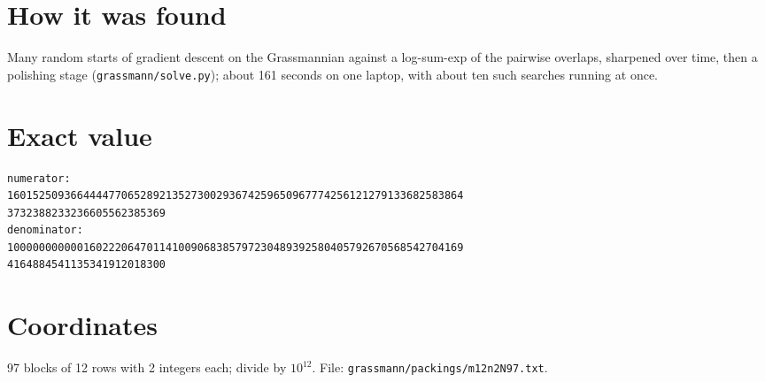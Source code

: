 \documentclass[11pt,a4paper]{article}
\begin{document}
\section{How it was found}
Many random starts of gradient descent on the Grassmannian against a log-sum-exp of the pairwise overlaps, sharpened over time, then a polishing stage (\texttt{grassmann/solve.py}); about 161 seconds on one laptop, with about ten such searches running at once.


\appendix
\section{Exact value}
{\small
\begin{verbatim}
numerator:
160152509366444477065289213527300293674259650967774256121279133682583864
3732388233236605562385369
denominator:
100000000000160222064701141009068385797230489392580405792670568542704169
4164884541135341912018300
\end{verbatim}}

\section{Coordinates}
97 blocks of 12 rows with 2 integers each; divide by $10^{12}$. File: \texttt{grassmann/packings/m12n2N97.txt}.
{\tiny
\begin{multicols}{4}
\end{multicols}}
\end{document}

